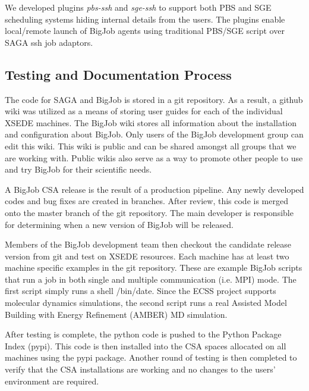 \documentclass{sig-alternate}
\begin{document}
\begin{itemize}
We developed plugins \textit{pbs-ssh} and \textit{sge-ssh} to support both PBS and SGE scheduling systems hiding internal details
from the users. The plugins enable local/remote launch of BigJob agents using traditional PBS/SGE script over SAGA ssh job adaptors. 
\end{itemize}





\subsection{Testing and Documentation Process}

The code for SAGA and BigJob is stored in a git repository. As a result, a github wiki was utilized as a means of storing user guides for each of the individual XSEDE machines. The BigJob wiki stores all information about the installation and configuration about BigJob. Only users of the BigJob development group can edit this wiki. This wiki is public and can be shared amongst all groups that we are working with. Public wikis also serve as a way to promote other people to use and try BigJob for their scientific needs.

A BigJob CSA release is the result of a production pipeline. Any newly developed codes and bug fixes are created in branches. After review, this code is merged onto the master branch of the git repository. The main developer is responsible for determining when a new version of BigJob will be released. 

Members of the BigJob development team then checkout the candidate release version from git and test on XSEDE resources. Each machine has at least two machine specific examples in the git repository. These are example BigJob scripts that run a job in both single and multiple communication (i.e. MPI) mode. The first script simply runs a shell /bin/date. Since the ECSS project supports molecular dynamics simulations, the second script runs a real Assisted Model Building with Energy Refinement (AMBER) MD simulation. 

After testing is complete, the python code is pushed to the Python Package Index (pypi). This code is then installed into the CSA spaces allocated on all machines using the pypi package. Another round of testing is then completed to verify that the CSA installations are working and no changes to the users' environment are required.
\end{document}
